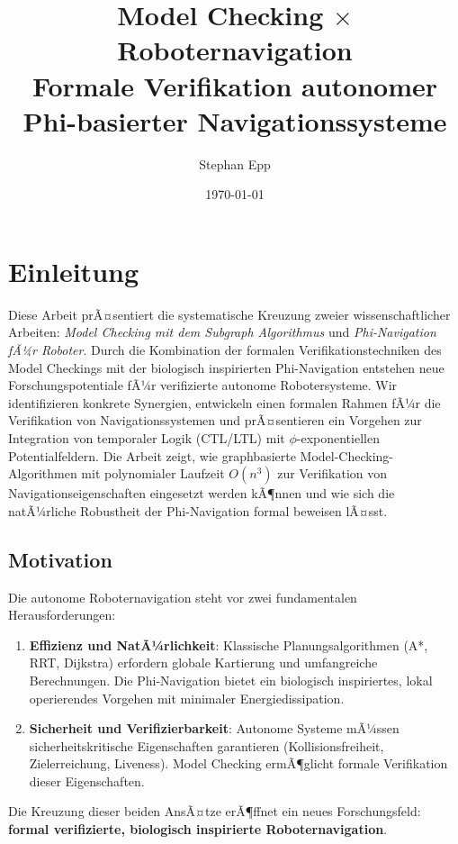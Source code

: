 ﻿\documentclass[a4paper,12pt]{article}
\title{Model Checking $\times$ Roboternavigation\\
	\large{Formale Verifikation autonomer Phi-basierter Navigationssysteme}}
\author{Stephan Epp}
\date{\today}
\theoremstyle{definition}
\begin{document}
	
\maketitle

\tableofcontents
\newpage

\section{Einleitung}

Diese Arbeit prÃ¤sentiert die systematische Kreuzung zweier wissenschaftlicher Arbeiten: \textit{Model Checking mit dem Subgraph Algorithmus} und \textit{Phi-Navigation fÃ¼r Roboter}. Durch die Kombination der formalen Verifikationstechniken des Model Checkings mit der biologisch inspirierten Phi-Navigation entstehen neue Forschungspotentiale fÃ¼r verifizierte autonome Robotersysteme. Wir identifizieren konkrete Synergien, entwickeln einen formalen Rahmen fÃ¼r die Verifikation von Navigationssystemen und prÃ¤sentieren ein Vorgehen zur Integration von temporaler Logik (CTL/LTL) mit $\phi$-exponentiellen Potentialfeldern. Die Arbeit zeigt, wie graphbasierte Model-Checking-Algorithmen mit polynomialer Laufzeit $O(n^3)$ zur Verifikation von Navigationseigenschaften eingesetzt werden kÃ¶nnen und wie sich die natÃ¼rliche Robustheit der Phi-Navigation formal beweisen lÃ¤sst.

\subsection{Motivation}

Die autonome Roboternavigation steht vor zwei fundamentalen Herausforderungen:

\begin{enumerate}
	\item \textbf{Effizienz und NatÃ¼rlichkeit}: Klassische Planungsalgorithmen (A*, RRT, Dijkstra) erfordern globale Kartierung und umfangreiche Berechnungen. Die Phi-Navigation bietet ein biologisch inspiriertes, lokal operierendes Vorgehen mit minimaler Energiedissipation.
	
	\item \textbf{Sicherheit und Verifizierbarkeit}: Autonome Systeme mÃ¼ssen sicherheitskritische Eigenschaften garantieren (Kollisionsfreiheit, Zielerreichung, Liveness). Model Checking ermÃ¶glicht formale Verifikation dieser Eigenschaften.
\end{enumerate}

Die Kreuzung dieser beiden AnsÃ¤tze erÃ¶ffnet ein neues Forschungsfeld: \textbf{formal verifizierte, biologisch inspirierte Roboternavigation}.
\end{document}
